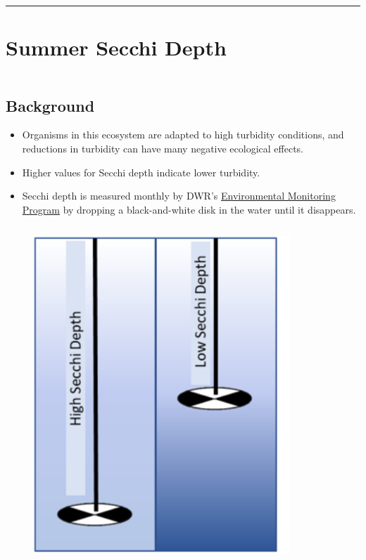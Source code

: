 \documentclass[
]{book}
\providecommand{\tightlist}{%
  \setlength{\itemsep}{0pt}\setlength{\parskip}{0pt}}
\begin{document}
\begin{center}\rule{0.5\linewidth}{0.5pt}\end{center}

\hypertarget{summer-secchi-depth}{%
\section{Summer Secchi Depth}\label{summer-secchi-depth}}

\begin{columns-nocenter}

\begin{column}

\hypertarget{background}{%
\subsection{Background}\label{background}}

\begin{itemize}
\tightlist
\item
  Organisms in this ecosystem are adapted to high turbidity conditions, and reductions in turbidity can have many negative ecological effects.
\item
  Higher values for Secchi depth indicate lower turbidity.
\item
  Secchi depth is measured monthly by DWR's \href{https://emp.baydeltalive.com/wiki/12297}{Environmental Monitoring Program} by dropping a black-and-white disk in the water until it disappears.
\end{itemize}

\end{column}

\begin{column}

\begin{figure}

{\centering \includegraphics[width=3.79in]{figures/secchidisc} 

}
\end{figure}
\end{column}
\end{columns-nocenter}
\end{document}
